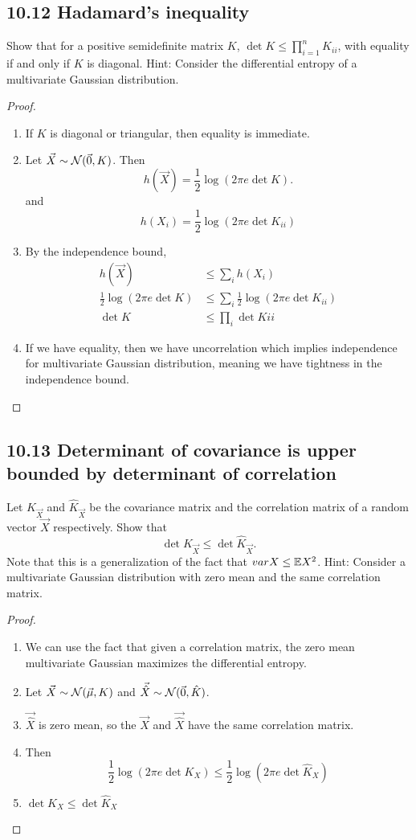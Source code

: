\documentclass[../main.tex]{subfiles}
\begin{document}
\subsection*{10.12 Hadamard's inequality}
Show that for a positive semidefinite matrix $K$, $\det K\leq \prod_{i=1}^nK_{ii}$, with equality if and only if $K$ is diagonal. 
\newline
Hint: Consider the differential entropy of a multivariate Gaussian distribution.
\begin{proof}
    \begin{enumerate}
        \item If $K$ is diagonal or triangular, then equality is immediate. 
        \item Let $\vec X\sim \mathcal{N}(\vec 0, K)$. Then \[
        h(\vec X) =\frac{1}{2}\log(2\pi e \det K).
        \] and \[
        h(X_i) = \frac{1}{2}\log(2\pi e\det K_{ii})
        \]
        \item By the independence bound, 
        \begin{align*}
            h(\vec X) &\leq \sum_i h(X_i)\\
            \frac{1}{2}\log(2\pi e \det K) &\leq \sum_i \frac{1}{2}\log(2\pi e\det K_{ii}) \\
            \det K &\leq \prod_i \det K{ii}
        \end{align*}
        \item If we have equality, then we have uncorrelation which implies independence for multivariate Gaussian distribution, meaning we have tightness in the independence bound.
    \end{enumerate}
\end{proof}
\subsection*{10.13 Determinant of covariance is upper bounded by determinant of correlation}
Let $K_{\vec X}$ and $\hat K_{\vec X}$ be the covariance matrix and the correlation matrix of a random vector $\vec X$ respectively. Show that \[
\det K_{\vec X} \leq \det \hat K_{\vec X}.
\]
Note that this is a generalization of the fact that $var X \leq \mathbb{E} X^2$.
Hint: Consider a multivariate Gaussian distribution with zero mean and the same correlation matrix.
\begin{proof}
    \begin{enumerate}
        \item We can use the fact that given a correlation matrix, the zero mean multivariate Gaussian maximizes the differential entropy.
        \item Let $\vec X \sim \mathcal{N}(\vec \mu, K)$ and $\vec{\hat X}\sim \mathcal{N}(\vec 0, \hat K)$.
        \item $\vec{\hat X}$ is zero mean, so the $\vec X$ and $\vec{\hat X}$ have the same correlation matrix. 
        \item Then \[
        \frac{1}{2}\log(2\pi e\det K_X) \leq \frac{1}{2}\log(2\pi e\det \hat K_X)
        \]
        \item $\det K_X \leq \det \hat K_X$
    \end{enumerate}
\end{proof}
\end{document}
